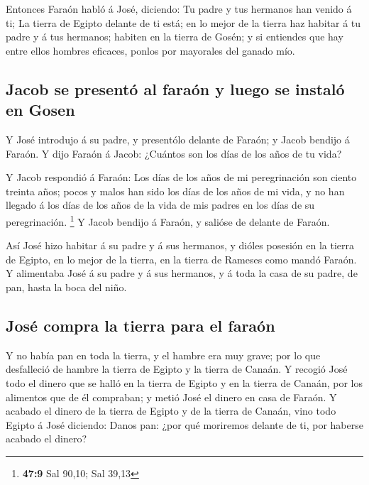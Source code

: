  Entonces Faraón habló á José, diciendo: Tu padre y tus
hermanos han venido á ti;  La tierra de Egipto delante de
ti está; en lo mejor de la tierra haz habitar á tu padre y á tus
hermanos; habiten en la tierra de Gosén; y si entiendes que hay entre
ellos hombres eficaces, ponlos por mayorales del ganado mío.

\hypertarget{jacob-se-presentuxf3-al-farauxf3n-y-luego-se-instaluxf3-en-gosen}{%
\subsection{Jacob se presentó al faraón y luego se instaló en
Gosen}\label{jacob-se-presentuxf3-al-farauxf3n-y-luego-se-instaluxf3-en-gosen}}

 Y José introdujo á su padre, y presentólo delante de
Faraón; y Jacob bendijo á Faraón.  Y dijo Faraón á Jacob:
¿Cuántos son los días de los años de tu vida?

 Y Jacob respondió á Faraón: Los días de los años de mi
peregrinación son ciento treinta años; pocos y malos han sido los días
de los años de mi vida, y no han llegado á los días de los años de la
vida de mis padres en los días de su peregrinación. \footnote{\textbf{47:9}
  Sal 90,10; Sal 39,13}  Y Jacob bendijo á Faraón, y
salióse de delante de Faraón.

 Así José hizo habitar á su padre y á sus hermanos, y
dióles posesión en la tierra de Egipto, en lo mejor de la tierra, en la
tierra de Rameses como mandó Faraón.  Y alimentaba José á
su padre y á sus hermanos, y á toda la casa de su padre, de pan, hasta
la boca del niño.

\hypertarget{josuxe9-compra-la-tierra-para-el-farauxf3n}{%
\subsection{José compra la tierra para el
faraón}\label{josuxe9-compra-la-tierra-para-el-farauxf3n}}

 Y no había pan en toda la tierra, y el hambre era muy
grave; por lo que desfalleció de hambre la tierra de Egipto y la tierra
de Canaán.  Y recogió José todo el dinero que se halló en
la tierra de Egipto y en la tierra de Canaán, por los alimentos que de
él compraban; y metió José el dinero en casa de Faraón. 
Y acabado el dinero de la tierra de Egipto y de la tierra de Canaán,
vino todo Egipto á José diciendo: Danos pan: ¿por qué moriremos delante
de ti, por haberse acabado el dinero?

